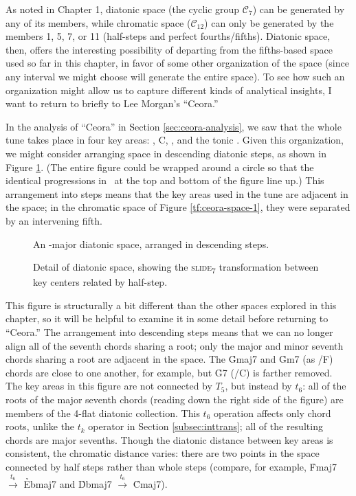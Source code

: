 As noted in Chapter 1, diatonic space (the cyclic group $\mathcal{C}_7$) can
be generated by any of its members, while chromatic space ($\mathcal{C}_{12}$)
can only be generated by the members 1, 5, 7, or 11 (half-steps and perfect
fourths/fifths). Diatonic \tf space, then, offers the interesting possibility
of departing from the fifths-based space used so far in this chapter, in
favor of some other organization of the space (since any interval we might
choose will generate the entire space). To see how such an organization
might allow us to capture different kinds of analytical insights, I want to
return to briefly to Lee Morgan's ``Ceora.''

In the analysis of ``Ceora'' in Section \ref{sec:ceora-analysis}, we saw that
the whole tune takes place in four key areas: \Dflat, C, \Bflat, and the tonic
\Aflat. Given this organization, we might consider arranging \tf space in
descending diatonic steps, as shown in Figure \ref{tfe:ab-diatonic-space}.
(The entire figure could be wrapped around a circle so that the identical \tfo
progressions in \Aflat\ at the top and bottom of the figure line up.) This
arrangement into steps means that the key areas used in the tune are adjacent
in the space; in the chromatic space of Figure \ref{tf:ceora-space-1}, they
were separated by an intervening fifth.

\begin{figure}[p]
  \caption{An \Aflat{}-major diatonic \tf space, arranged in descending steps.}
  \label{tfe:ab-diatonic-space}
\end{figure}

\begin{figure}[p]
  \caption{Detail of diatonic \tf space, showing the \textsc{slide}\textsubscript{7}
    transformation between key centers related by half-step.}
  \label{tfe:diatonic-space-detail}
\end{figure}

This figure is structurally a bit different than the other spaces explored in
this chapter, so it will be helpful to examine it in some detail before
returning to ``Ceora.'' The arrangement into descending steps means that we
can no longer align all of the seventh chords sharing a root; only the major
and minor seventh chords sharing a root are adjacent in the space.
The \h{Gmaj7} and \h{Gm7} (as \ii/F) chords are close to one another, for
example, but \h{G7} (\V/C) is farther removed. The key areas in this figure
are not connected by $T_5$, but instead by $t_6$: all of the roots of the
major seventh chords (reading down the right side of the figure) are members
of the 4-flat diatonic collection. This $t_6$ operation affects
only chord roots, unlike the $t_k$ operator in Section \ref{subsec:inttrans};
all of the resulting chords are major sevenths. Though the diatonic distance
between key areas is consistent, the chromatic distance varies: there are two
points in the space connected by half steps rather than whole steps (compare,
for example, \h{Fmaj7} $\xrightarrow{\;t_6\;}$ \h{Ebmaj7} and \h{Dbmaj7}
$\xrightarrow{\;t_6\;}$ \h{Cmaj7}).

